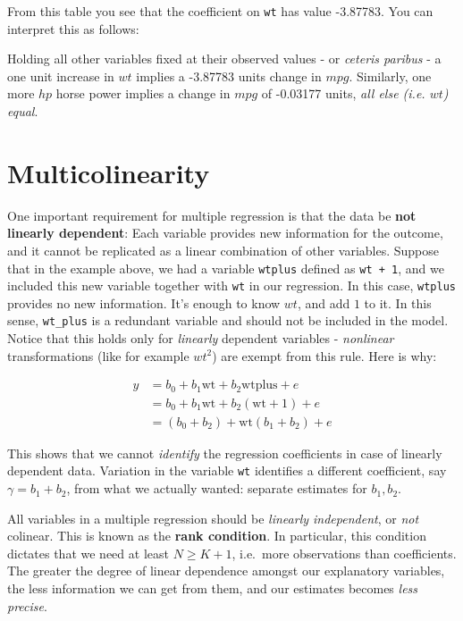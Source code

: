 \documentclass[]{book}
\newenvironment{note}{\begin{tcolorbox}[colback=blue!5!white,colframe=blue!75!black]}{\end{tcolorbox}}
\newenvironment{warning}{\begin{tcolorbox}[colback=orange!5!white,colframe=orange]}{\end{tcolorbox}}
\begin{document}
From this table you see that the coefficient on \texttt{wt} has value
-3.87783. You can interpret this as follows:

\begin{warning}
Holding all other variables fixed at their observed values - or
\emph{ceteris paribus} - a one unit increase in \(wt\) implies a
-3.87783 units change in \(mpg\). Similarly, one more \(hp\) horse power
implies a change in \(mpg\) of -0.03177 units, \emph{all else (i.e.
\(wt\)) equal}.
\end{warning}

\section{Multicolinearity}\label{multicol}

One important requirement for multiple regression is that the data be
\textbf{not linearly dependent}: Each variable provides new information
for the outcome, and it cannot be replicated as a linear combination of
other variables. Suppose that in the example above, we had a variable
\texttt{wtplus} defined as \texttt{wt\ +\ 1}, and we included this new
variable together with \texttt{wt} in our regression. In this case,
\texttt{wtplus} provides no new information. It's enough to know \(wt\),
and add \(1\) to it. In this sense, \texttt{wt\_plus} is a redundant
variable and should not be included in the model. Notice that this holds
only for \emph{linearly} dependent variables - \emph{nonlinear}
transformations (like for example \(wt^2\)) are exempt from this rule.
Here is why:

\begin{align}
y &= b_0 + b_1 \text{wt} + b_2 \text{wtplus} + e \\
  &= b_0 + b_1 \text{wt} + b_2 (\text{wt} + 1) + e \\
  &= (b_0 + b_2) + \text{wt} (b_1 + b_2) + e
\end{align}

This shows that we cannot \emph{identify} the regression coefficients in
case of linearly dependent data. Variation in the variable \texttt{wt}
identifies a different coefficient, say \(\gamma = b_1 + b_2\), from
what we actually wanted: separate estimates for \(b_1,b_2\).

\begin{note}
All variables in a multiple regression should be \emph{linearly
independent}, or \emph{not} colinear. This is known as the \textbf{rank
condition}. In particular, this condition dictates that we need at least
\(N \geq K+1\), i.e.~more observations than coefficients. The greater
the degree of linear dependence amongst our explanatory variables, the
less information we can get from them, and our estimates becomes
\emph{less precise}.
\end{note}
\end{document}
